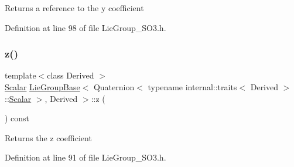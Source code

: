 \begin{DoxyReturn}{Returns}
a reference to the {\ttfamily y} coefficient 
\end{DoxyReturn}


Definition at line 98 of file Lie\+Group\+\_\+\+S\+O3.\+h.

\hypertarget{class_lie_group_base_3_01_quaternion_3_01typename_01internal_1_1traits_3_01_derived_01_4_1_1_scalar_01_4_00_01_derived_01_4_a4ed22606c7d99d80841cf677b1982ddb}{}\label{class_lie_group_base_3_01_quaternion_3_01typename_01internal_1_1traits_3_01_derived_01_4_1_1_scalar_01_4_00_01_derived_01_4_a4ed22606c7d99d80841cf677b1982ddb} 
\subsubsection{\texorpdfstring{z()}{z()}\hspace{0.1cm}{\footnotesize\ttfamily [1/2]}}
{\footnotesize\ttfamily template$<$class Derived $>$ \\
\hyperlink{class_lie_group_base_3_01_quaternion_3_01typename_01internal_1_1traits_3_01_derived_01_4_1_1_scalar_01_4_00_01_derived_01_4_afadeceb3b98e52deecc572e71efb82a8}{Scalar} \hyperlink{class_lie_group_base}{Lie\+Group\+Base}$<$ Quaternion$<$ typename internal\+::traits$<$ Derived $>$\+::\hyperlink{class_lie_group_base_3_01_quaternion_3_01typename_01internal_1_1traits_3_01_derived_01_4_1_1_scalar_01_4_00_01_derived_01_4_afadeceb3b98e52deecc572e71efb82a8}{Scalar} $>$, Derived $>$\+::z (\begin{DoxyParamCaption}{ }\end{DoxyParamCaption}) const\hspace{0.3cm}{\ttfamily [inline]}}

\begin{DoxyReturn}{Returns}
the {\ttfamily z} coefficient 
\end{DoxyReturn}


Definition at line 91 of file Lie\+Group\+\_\+\+S\+O3.\+h.

\hypertarget{class_lie_group_base_3_01_quaternion_3_01typename_01internal_1_1traits_3_01_derived_01_4_1_1_scalar_01_4_00_01_derived_01_4_a4eb79d996118d9bdb75410d8b7b05cd6}{}\label{class_lie_group_base_3_01_quaternion_3_01typename_01internal_1_1traits_3_01_derived_01_4_1_1_scalar_01_4_00_01_derived_01_4_a4eb79d996118d9bdb75410d8b7b05cd6} 
